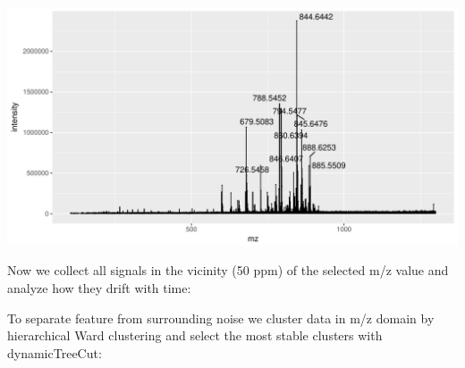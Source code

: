 \documentclass[]{article}
\newenvironment{Shaded}{\begin{snugshade}}{\end{snugshade}}
\newcommand{\KeywordTok}[1]{\textcolor[rgb]{0.13,0.29,0.53}{\textbf{#1}}}
\newcommand{\FloatTok}[1]{\textcolor[rgb]{0.00,0.00,0.81}{#1}}
\newcommand{\StringTok}[1]{\textcolor[rgb]{0.31,0.60,0.02}{#1}}
\newcommand{\OperatorTok}[1]{\textcolor[rgb]{0.81,0.36,0.00}{\textbf{#1}}}
\newcommand{\NormalTok}[1]{#1}
\begin{document}
\includegraphics{Supplementary_document_files/figure-latex/ion.plots.174-1.pdf}

Now we collect all signals in the vicinity (50 ppm) of the selected m/z
value and analyze how they drift with time:

\begin{Shaded}
\end{Shaded}

To separate feature from surrounding noise we cluster data in m/z domain
by hierarchical Ward clustering and select the most stable clusters with
dynamicTreeCut:
\end{document}
